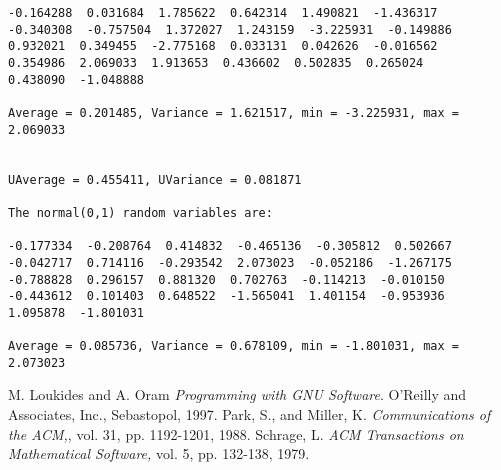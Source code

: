 \documentclass{article}
\begin{document}
{\begin{verbatim}
-0.164288  0.031684  1.785622  0.642314  1.490821  -1.436317  
-0.340308  -0.757504  1.372027  1.243159  -3.225931  -0.149886  
0.932021  0.349455  -2.775168  0.033131  0.042626  -0.016562  
0.354986  2.069033  1.913653  0.436602  0.502835  0.265024  
0.438090  -1.048888  

Average = 0.201485, Variance = 1.621517, min = -3.225931, max = 2.069033 


UAverage = 0.455411, UVariance = 0.081871

The normal(0,1) random variables are:

-0.177334  -0.208764  0.414832  -0.465136  -0.305812  0.502667  
-0.042717  0.714116  -0.293542  2.073023  -0.052186  -1.267175  
-0.788828  0.296157  0.881320  0.702763  -0.114213  -0.010150  
-0.443612  0.101403  0.648522  -1.565041  1.401154  -0.953936  
1.095878  -1.801031  

Average = 0.085736, Variance = 0.678109, min = -1.801031, max = 2.073023 

\end{verbatim}
}

\pagebreak
\begin{thebibliography}{10}
 M. Loukides and A. Oram  {\sl Programming with GNU
Software}.  O'Reilly and Associates, Inc., Sebastopol, 1997.
 Park, S., and Miller, K. {\sl Communications of
the ACM,}, vol. 31, pp. 1192-1201, 1988.
 Schrage, L. {\sl ACM Transactions on 
Mathematical Software,} vol. 5, pp. 132-138, 1979.
\end{thebibliography}
\end{document}
